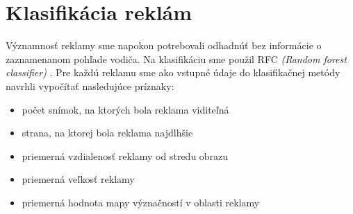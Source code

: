 \section{Klasifikácia reklám}

Významnosť reklamy sme napokon potrebovali odhadnúť bez informácie o zaznamenanom pohľade vodiča. Na klasifikáciu sme použil RFC \textit{(Random forest classifier)} \cite{rfc}. Pre každú reklamu sme ako vstupné údaje do klasifikačnej metódy navrhli vypočítať nasledujúce príznaky:

\begin{itemize}
  \item počet snímok, na ktorých bola reklama viditeľná
  \item strana, na ktorej bola reklama najdlhšie
  \item priemerná vzdialenosť reklamy od stredu obrazu
  \item priemerná veľkosť reklamy
  \item priemerná hodnota mapy význačností v oblasti reklamy
\end{itemize}

